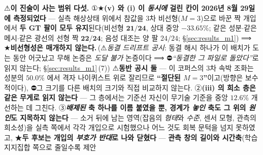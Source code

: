 \documentclass[11pt]{report}
\numberwithin{equation}{chapter}
\numberwithin{figure}{chapter}
\numberwithin{table}{chapter}
\newcommand{\MOneDrift}{\,(⚠\emph{동결 드리프트 공시}: 동결 해시 하나가 이 배치가 도는
동안 어긋났고 무해 논증은 \emph{도달 불가} 논증이다 ⟹ ⛔\emph{``동결한 그 파일로
돌았다''}로 읽지 않는다; \S\ref{sec:results_m1}\,(7))}
\newcommand{\MFourGate}{\,(⚠\emph{게이트 개정 공시 $\cdot$ ★등급: \textbf{탐색적}}:
이 배치의 양성대조 게이트는 \textbf{결과를 본 뒤에} 끝단에서 원자 수준으로 완화되었고
실패한 측정은 판정문에 남아 있다 ⟹ ⛔\emph{``사전등록된 게이트를 그대로 통과했다''}로
읽지 않으며, 이 행의 읽기 등급은 \textbf{확증이 아니라 탐색(\texttt{EXPLORATORY})}이다
--- 2026-08-30 강등, 사유와 축자 회계는 \S\ref{sec:cite-status-m4};
⛔이 행을 기여의 지위나 후속 측정의 우선순위 근거로 인용하지 않는다)}
\begin{document}
⚠\textbf{이 진술이 사는 범위 다섯.}
①★\textbf{(v) 와 (i) 이 \emph{동시에} 걸린 칸이 2026년 8월 29일에 측정되었다} --- 실측
해상상태 위에서 참값을 $3$차 비선형($M{=}3$)으로 바꾼 짝 개입에서 \textbf{두 GT 팔이 모두
유지}된다(비선형 $\mathbf{21/24}$, 상대 중앙 $\mathbf{-33.65\%}$; 같은 성분$\cdot$같은
메시$\cdot$같은 광선의 선형 짝 $\mathbf{22/24}$; 음성 대조는 양 팔 $24/24$;
\S\ref{sec:results_m1}) ⟹ ★\textbf{비선형성은 매개하지 않는다.}\MOneDrift{}
⚠\textbf{동반 공시 둘} --- 이 코퍼스의 $3$차 속박 조화는 성분의 $50.0\%$ 에서 격자
나이퀴스트 위로 잘리므로 \textbf{``절단된 $M{=}3$''}이고(방향은 보수적이다),
⛔그 크기를 다른 배치의 크기와 직접 비교하지 않는다.
②\textbf{(iii) 의 희소 층은 같은 무게로 읽지 않는다} --- 그 층에서는 기준선 자신이
무기술 기준을 중앙 $12.6\%$ 개선하는 데 그친다.
③\textbf{\emph{배제된} 축 하나를 이름 붙였을 뿐, 경계가 \emph{놓인} 축도 그 위의
\emph{원인}도 지목하지 않는다} --- 소거 뒤에 남는 영역(잡음의 \emph{형태}와
\emph{수준}, 센서 모형, 관측의 희소성)을 실측 쪽에서 각각 개입으로 시험했으나
어느 것도 회복 문턱을 넘지 못하였고, ★\textbf{두 후보는 개입의 \emph{부호가 반대}로
나와 닫혔다} --- \textbf{관측 창의 길이와 시간축}(학습 지지집합 쪽으로 줄일수록 제안
\end{document}

